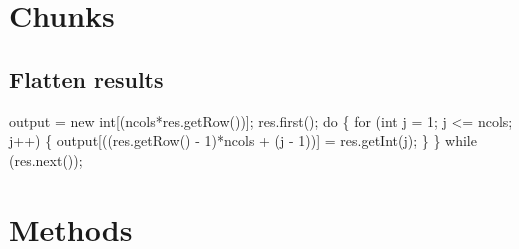\section{Chunks}

\subsection{Flatten results}
\nwenddocs{}\endmoddef{}
output = new int[(ncols*res.getRow())];
res.first();
do \{
  for (int j = 1; j <= ncols; j++) \{
    output[((res.getRow() - 1)*ncols + (j - 1))] = res.getInt(j);
  \}
\} while (res.next());
\nwendcode{}\nwdocspar

\section{Methods}

